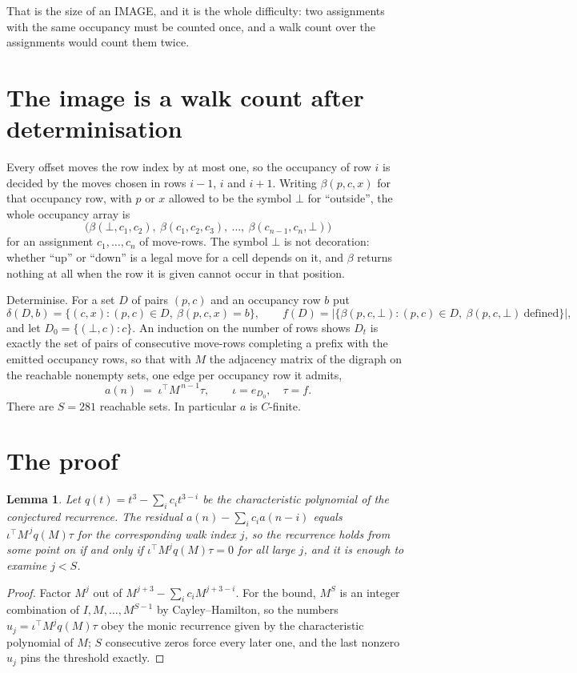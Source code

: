 \documentclass[11pt,a4paper]{article}
\theoremstyle{plain}
\newtheorem{lemma}[theorem]{Lemma}
\theoremstyle{definition}
\begin{document}
That is the size of an IMAGE, and it is the whole difficulty: two assignments with the same
occupancy must be counted once, and a walk count over the assignments would count them twice.

\section{The image is a walk count after determinisation}

Every offset moves the row index by at most one, so the occupancy of row $i$ is decided by the
moves chosen in rows $i-1$, $i$ and $i+1$. Writing $\beta(p,c,x)$ for that occupancy row, with
$p$ or $x$ allowed to be the symbol $\bot$ for ``outside'', the whole occupancy array is
\[
\bigl(\beta(\bot,c_1,c_2),\ \beta(c_1,c_2,c_3),\ \dots,\ \beta(c_{n-1},c_n,\bot)\bigr)
\]
for an assignment $c_1,\dots,c_n$ of move-rows. The symbol $\bot$ is not decoration: whether
``up'' or ``down'' is a legal move for a cell depends on it, and $\beta$ returns nothing at all
when the row it is given cannot occur in that position.

Determinise. For a set $D$ of pairs $(p,c)$ and an occupancy row $b$ put
\[
\delta(D,b)=\{(c,x):(p,c)\in D,\ \beta(p,c,x)=b\},\qquad
f(D)=\bigl|\{\beta(p,c,\bot):(p,c)\in D,\ \beta(p,c,\bot)\ \text{defined}\}\bigr| ,
\]
and let $D_0=\{(\bot,c):c\}$. An induction on the number of rows shows $D_t$ is exactly the
set of pairs of consecutive move-rows completing a prefix with the emitted occupancy rows, so
that with $M$ the adjacency matrix of the digraph on the reachable nonempty sets, one edge per
occupancy row it admits,
\[
a(n)\;=\;\iota^{\!\top}M^{\,n-1}\tau,\qquad \iota=e_{D_0},\quad \tau=f .
\]
There are $S=281$ reachable sets. In particular $a$ is $C$-finite.

\section{The proof}

\begin{lemma}\label{lem:crit}
Let $q(t)=t^{3}-\sum_i c_it^{3-i}$ be the characteristic polynomial of the
conjectured recurrence. The residual $a(n)-\sum_ic_ia(n-i)$ equals
$\iota^{\!\top}M^{\,j}q(M)\tau$ for the corresponding walk index $j$, so the recurrence
holds from some point on if and only if $\iota^{\!\top}M^{j}q(M)\tau=0$ for all large $j$,
and it is enough to examine $j<S$.
\end{lemma}

\begin{proof}
Factor $M^{j}$ out of $M^{j+3}-\sum_ic_iM^{j+3-i}$. For the bound, $M^{S}$
is an integer combination of $I,M,\dots,M^{S-1}$ by Cayley--Hamilton, so the numbers
$u_j=\iota^{\!\top}M^{j}q(M)\tau$ obey the monic recurrence given by the characteristic
polynomial of $M$; $S$ consecutive zeros force every later one, and the last nonzero $u_j$
pins the threshold exactly.
\end{proof}
\end{document}
